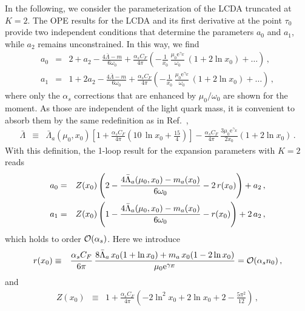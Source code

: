 \documentclass[a4paper,11pt]{article}
\begin{document}
In the following, we consider the parameterization of the LCDA truncated at $K=2$. The OPE results for the LCDA and its first derivative at the point $\tau_0$ provide two independent conditions that determine the parameters $a_0$ and $a_1$, while $a_2$ remains unconstrained.
%
In this way, we find
\begin{eqnarray}
    a_0 &=& 
    2 + a_2 - \frac{4\bar\Lambda- m}{6\omega_0} + \frac{\alpha_s C_F}{4\pi} \left( - \frac{1}{x_0} \, \frac{\mu_0 \mathrm{e}^{\gamma_E}}{\omega_0} \, (1+ 2 \ln x_0 ) + \ldots \right) \,, 
    \\
%
    a_1 &=& 1 + 2 a_2 - \frac{4\bar\Lambda- m}{6\omega_0} + \frac{\alpha_s C_F}{4\pi} \left(
     - \frac{1}{x_0} \, \frac{\mu_0 \mathrm{e}^{\gamma_E}}{\omega_0} \, (1+ 2 \ln x_0 ) + \ldots\right) \,, 
%
\end{eqnarray}
where only the $\alpha_s$ corrections that are enhanced by $\mu_0 / \omega_0$ are shown for the moment. 
As those are independent of the light quark mass, it is convenient to absorb them by the same redefinition as in Ref.~\cite{Feldmann:2022uok},
\begin{eqnarray}
    \bar \Lambda & \equiv  &
    \bar \Lambda_a(\mu_0, x_0)
    \left[ 1 + \frac{\alpha_s C_F}{4\pi} \left( 
    10\, \ln x_0 + \frac{15}{4} \right) \right]
    - \frac{\alpha_s C_F}{4\pi}  \, \frac{3\mu_0 \mathrm{e}^{\gamma_E}}{2x_0} \left( 1+ 2 \ln x_0 \right) 
    \label{eq:Lama1} \,.
\end{eqnarray}
%
With this definition, the 1-loop result for the expansion parameters with $K=2$ reads
\begin{eqnarray}
    a_0  &=& Z(x_0) \left( 2 - 
    \frac{4 \bar\Lambda_a(\mu_0, x_0) - m_a(x_0)}{6\omega_0}
    - 2 \, r(x_0)
    \right) + a_2 \,, 
    \cr
    a_1  &=& Z(x_0) \left( 1 - 
    \frac{4 \bar\Lambda_a(\mu_0, x_0) - m_a(x_0)}{6\omega_0}
    - r(x_0) 
    \right) +2 \, a_2
    \,,
    \label{eq:exp_coeff_res}
\end{eqnarray}
which holds to order ${\cal O}(\alpha_s)$. Here we  introduce 
\begin{eqnarray}
    r(x_0) &\equiv& \frac{\alpha_s C_F}{6\pi} \, \frac{8\bar\Lambda_a \, x_0 (1+\ln x_0) + m_a \, x_0 (1- 2\ln x_0)}{\mu_0 \mathrm{e}^{\gamma_E}} = {\cal O}(\alpha_s n_0) \,,
\end{eqnarray}
and 
\begin{eqnarray}
    Z(x_0) &\equiv& 1+\frac{\alpha_s C_F}{4\pi} \left( -2\ln^2 x_0+2\ln x_0 + 2 - \frac{5\pi^2}{12} \right) \,,
\end{eqnarray}
\end{document}
